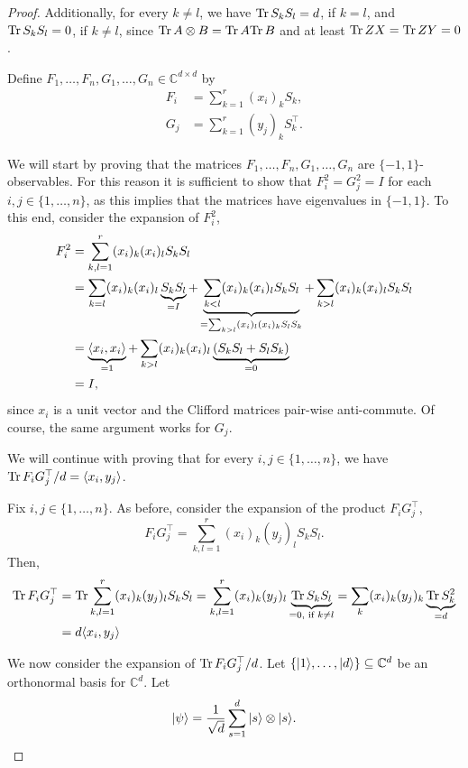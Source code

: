 \begin{proof}
	Additionally, for every $k\neq l$, we have $\text{Tr} \, {S_kS_l} =d$, if $k=l$, and $\text{Tr} \, {S_kS_l} =0$, if $k\neq l$, since $\text{Tr} \, {A\otimes B}  = \text{Tr} \, {A} \text{Tr} \, {B} $ and at least $\text{Tr} \, {ZX} =\text{Tr} \, {ZY} =0$.
	
	Define $F_1,\dots,F_n,G_1,\dots,G_n\in\mathbb{C}^{d\times d}$ by
	\begin{align}
		F_i&=\sum_{k=1}^r (x_i)_k S_k,\\
		G_j&=\sum_{k=1}^r (y_j)_k S_k^\top.
	\end{align}
	
	We will start by proving that the matrices $F_1,\dots,F_n,G_1,\dots,G_n$ are $\{-1,1\}$-observables.
	For this reason it is sufficient to show that $F_i^2=G_j^2=I$ for each $i,j\in\{1,\dots,n\}$, as this implies that the matrices have eigenvalues in $\{-1,1\}$. To this end, consider the expansion of $F_i^2$,
	\begin{align*}
		F_i^2 &= \sum_{k,l=1}^r (x_i)_k(x_i)_l S_k S_l \\
		&= \sum_{k=l} (x_i)_k(x_i)_l \underbrace{S_k S_l}_{=I} + \underbrace{\sum_{k<l} (x_i)_k(x_i)_l S_k S_l}_{=\sum_{k>l} (x_i)_l(x_i)_k S_l S_k} + \sum_{k>l} (x_i)_k(x_i)_l S_k S_l \\
		&= \underbrace{\langle{x_i},{x_i}\rangle}_{=1} + \sum_{k>l} (x_i)_k(x_i)_l \underbrace{(S_k S_l+S_l S_k)}_{=0}\\
		&= I, 
	\end{align*}
	since $x_i$ is a unit vector and the Clifford matrices pair-wise anti-commute.
	Of course, the same argument works for $G_j$.
	
	We will continue with proving that for every $i,j\in\{1,\dots,n\}$, we have $\text{Tr} \, {F_iG_j^\top} /d=\langle{x_i},{y_j}\rangle$.
	
	Fix $i,j\in\{1,\dots,n\}$. As before, consider the expansion of the product $F_iG_j^\top$,
	\begin{equation}
		F_iG_j^\top = \sum_{k,l=1}^r (x_i)_k(y_j)_lS_kS_l.
	\end{equation}
	Then,
	\begin{align*}
		\text{Tr} \, {F_iG_j^\top}  &= \text{Tr} \, {\sum_{k,l=1}^r (x_i)_k(y_j)_lS_kS_l}  
		= \sum_{k,l=1}^r (x_i)_k(y_j)_l \underbrace{\text{Tr} \, {S_kS_l} }_{=0,\text{ if } k\neq l}
		= \sum_{k} (x_i)_k(y_j)_k \underbrace{\text{Tr} \, {S_k^2} }_{=d}\\
		&= d \langle{x_i},{y_j}\rangle 
	\end{align*}
	
	We now consider the expansion of $\text{Tr} \, {F_iG_j^\top} /d$. Let $\{\vert {1} \rangle,\dots,\vert {d} \rangle\}\subseteq \mathbb{C}^d$ be an orthonormal basis for $\mathbb{C}^d$. Let
	\begin{equation}
		\vert {\psi} \rangle = \frac{1}{\sqrt{d}} \sum_{s=1}^d \vert {s} \rangle \otimes \vert {s} \rangle.
	\end{equation} 
	

\end{proof}
